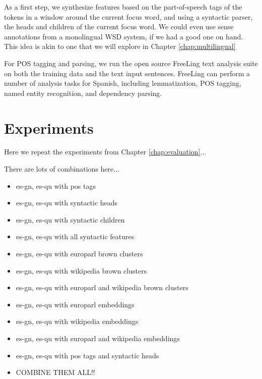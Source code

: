 As a first step, we synthesize features based on the part-of-speech tags of the
tokens in a window around the current focus word, and using a syntactic parser,
the heads and children of the current focus word.  We could even use sense
annotations from a monolingual WSD system, if we had a good one on hand. This
idea is akin to one that we will explore in Chapter \ref{chap:multilingual}

For POS tagging and parsing, we run the open source FreeLing text analysis
suite \cite{padro12} on both the training data and the text input sentences.
FreeLing can perform a number of analysis tasks for Spanish, including
lemmatization, POS tagging, named entity recognition, and dependency parsing.

\section{Experiments}
Here we repeat the experiments from Chapter \ref{chap:evaluation}...

There are lots of combinations here...

\begin{itemize}
  \item es-gn, es-qu with pos tags
  \item es-gn, es-qu with syntactic heads
  \item es-gn, es-qu with syntactic children
  \item es-gn, es-qu with all syntactic features
\end{itemize}

\begin{itemize}
  \item es-gn, es-qu with europarl brown clusters
  \item es-gn, es-qu with wikipedia brown clusters
  \item es-gn, es-qu with europarl and wikipedia brown clusters
\end{itemize}

\begin{itemize}
  \item es-gn, es-qu with europarl embeddings
  \item es-gn, es-qu with wikipedia embeddings
  \item es-gn, es-qu with europarl and wikipedia embeddings
  \item es-gn, es-qu with pos tags and syntactic heads
\end{itemize}

\begin{itemize}
  \item COMBINE THEM ALL!!
\end{itemize}
